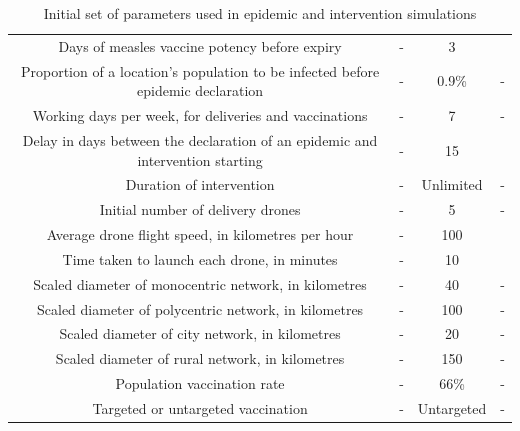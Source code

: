 \documentclass[10pt,letterpaper]{article}
\begin{document}
\begin{table}[ht!]
{\begin{tabular}{|c|c|c|c|}
Days of measles vaccine potency before expiry                                    & -             & 3                & \cite{msf_ectc_2018} \\
Proportion of a location's population to be infected before epidemic declaration & -             & 0.9\%             & - \\
Working days per week, for deliveries and vaccinations                           & -             & 7                & - \\
Delay in days between the declaration of an epidemic and intervention starting   & -             & 15               & \cite{grais2006exploring} \\
Duration of intervention                                                     & -             & Unlimited        & - \\
Initial number of delivery drones                                                                 & -             & 5       & -  \\
Average drone flight speed, in kilometres per hour                               & -             & 100              & \cite{zipline_impact} \\
Time taken to launch each drone, in minutes                                        & -             & 10             & \cite{ackerman_koziol_2019}  \\
Scaled diameter of monocentric network, in kilometres                                       & -             & 40               & -   \\
Scaled diameter of polycentric network, in kilometres                                         & -             & 100              & -     \\
Scaled diameter of city network, in kilometres                                                & -             & 20               & -   \\
Scaled diameter of rural network, in kilometres                                               & -             & 150              & -    \\
Population vaccination rate                                                   & -             & 66\%             & - \\
Targeted or untargeted vaccination                                 & -             & Untargeted       & - \\ \hline
\end{tabular}%
}
\caption{Initial set of parameters used in epidemic and intervention simulations}
\label{tab:initial_params}
\end{table}
\end{document}
